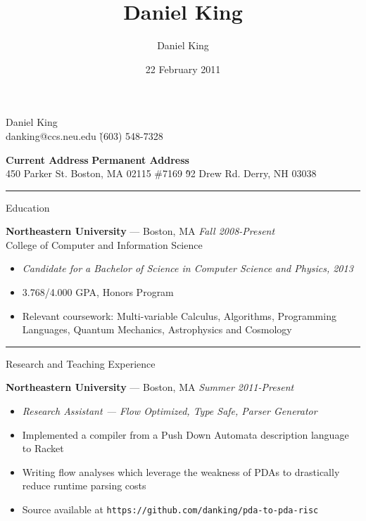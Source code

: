 \documentclass[10pt]{letter}
\author{Daniel King}
\title{Daniel King}
\date{22 February 2011}
\begin{document}
\begin{tabbing}{\Huge Daniel King} \\
\normalsize danking@ccs.neu.edu \`(603) 548-7328
\end{tabbing}

\vspace{-10pt}
\begin{tabbing}
\textbf{Current Address} \`\textbf{Permanent Address}\\
450 Parker St. Boston, MA 02115 \#7169 \`92 Drew Rd. Derry, NH 03038
\end{tabbing}\vspace{-15pt}
\rule{\linewidth}{.5pt}

{\Large Education}
\begin{tabbing}
{\large \bf Northeastern University} --- Boston, MA \` \textit{Fall 2008-Present} \\
College of Computer and Information Science
\end{tabbing}\vspace{-10pt}

\begin{itemize}
\setlength\itemsep{1pt}
\item [] {\textit{Candidate for a Bachelor of Science in Computer Science and
    Physics, 2013}}
\item{3.768/4.000 GPA, Honors Program}
\item{Relevant coursework: Multi-variable Calculus, Algorithms, Programming
  Languages, Quantum Mechanics, Astrophysics and Cosmology}
\end{itemize}

\rule{\linewidth}{.5pt}

{\Large Research and Teaching Experience}

\begin{tabbing}
{\large \bf Northeastern University} --- Boston, MA \` \textit{Summer 2011-Present}

\end{tabbing}
\begin{itemize}
\setlength\itemsep{1pt}
\item [] {\textit{Research Assistant --- Flow Optimized, Type Safe, Parser
    Generator}}
\item{Implemented a compiler from a Push Down Automata description language to Racket}
\item{Writing flow analyses which leverage the weakness of PDAs to drastically
  reduce runtime parsing costs}
\item{Source available at \texttt{https://github.com/danking/pda-to-pda-risc}}
\end{itemize}
\end{document}

